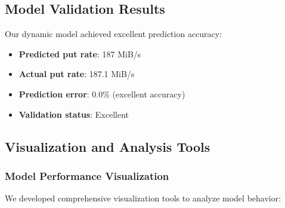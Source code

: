 \documentclass[11pt,twocolumn]{article}
\begin{document}
\subsection{Model Validation Results}

Our dynamic model achieved excellent prediction accuracy:
\begin{itemize}
    \item \textbf{Predicted put rate}: 187 MiB/s
    \item \textbf{Actual put rate}: 187.1 MiB/s
    \item \textbf{Prediction error}: 0.0\% (excellent accuracy)
    \item \textbf{Validation status}: Excellent
\end{itemize}

\subsection{Visualization and Analysis Tools}

\subsubsection{Model Performance Visualization}
We developed comprehensive visualization tools to analyze model behavior:
\end{document}
